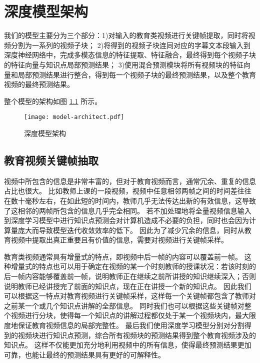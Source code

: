 \chapter{深度模型架构}
    我们的模型主要分为三个部分：1)对输入的教育类视频进行关键帧提取，同时将视频分割为一系列的视频子块；
    2)将得到的视频子块连同对应的字幕文本段输入到深度神经网络中，完成多模态信息的特征提取、特征融合，最终得到每个视频子块的特征向量与知识点局部预测结果；
    3)使用混合预测模块将所有视频块的特征向量和局部预测结果进行整合，得到每一个视频子块的最终预测结果，以及整个教育视频的最终预测结果。

    整个模型的架构如图 \ref{fig3.1} 所示。
    
    \begin{figure}[t]
        \centering
        \texttt{[image: model-architect.pdf]}
        \caption{深度模型架构}
        \label{fig3.1}
    \end{figure}

\section{教育视频关键帧抽取}
    视频中所包含的信息是非常丰富的，但对于教育视频而言，通常冗余、重复的信息占比也很大。
    比如教师上课的一段视频，视频中任意相邻两帧之间的时间差往往在数十毫秒左右，在如此短的时间内，教师几乎无法传达出新的有效信息，这导致了这相邻的两帧所包含的信息几乎完全相同。
    若不加处理地将全量视频信息输入到深度学习模型中进行知识点预测会对计算机造成不必要的负担，同时也会因为计算量庞大而导致模型迭代收敛效率的低下。
    因此为了减少冗余的信息，同时从教育视频中提取出真正重要且有价值的信息，需要对视频进行关键帧采样。

    教育类视频通常具有增量式\cite{Wang2020FineGrainedSM}的特点，即视频中后一帧的内容可以覆盖前一帧。
    这种增量式的特点也可以用于确定在视频的某一个时刻教师的授课状况：若该时刻的后一帧内容能够覆盖前一帧，说明教师正在继续之前所讲授的知识继续深入；否则说明教师已经讲授完了前面的知识点，现在正在讲授一个新的知识点。
    因此我们可以根据这一特点对教育视频进行关键帧采样，这样每一个关键帧都包含了教师对之前某一个或几个知识点讲解的全部信息。
    同时我们也可以根据这些关键帧对整个视频进行分块，使得每一个知识点的讲解过程都仅处于某一个视频块内，最大限度地保证教育视频信息的局部完整性。
    最后我们使用深度学习模型分别对分割得到的视频块进行知识点预测，综合所有视频块的预测结果得到整个教育视频涉及的知识点。
    这样不仅能更加充分地利用视频中的所有信息，使得最终预测结果更加可靠，也能让最终的预测结果具有更好的可解释性。

